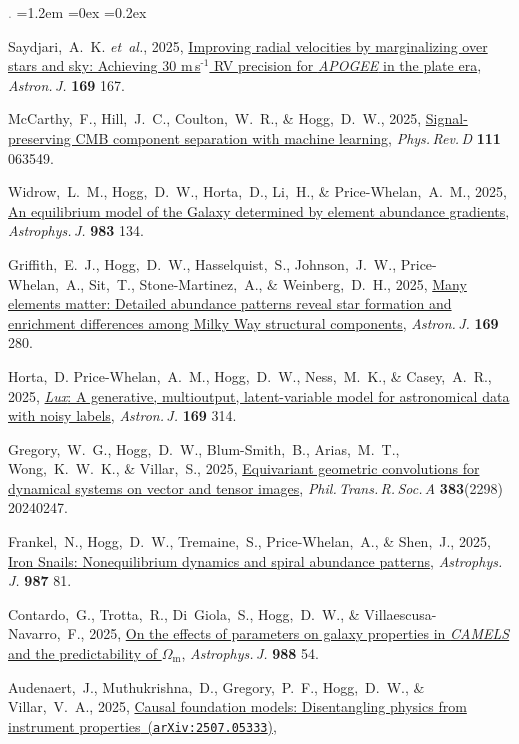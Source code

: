 \documentclass[10pt,letterpaper]{article}
\newcommand{\acronym}[1]{{\small{#1}}}
\newcommand{\foreign}[1]{\textsl{#1}}
\newcommand{\etal}{\foreign{et~al.}}
\newcommand{\project}[1]{\textsl{#1}}
\newcommand{\doi}[2]{\href{http://dx.doi.org/#1}{{#2}}}
\newcommand{\arxiv}[2]{\href{http://arxiv.org/abs/#1}{{#2}\ (\texttt{arXiv:#1})}}
\newcommand{\deemph}[1]{\textcolor{grey}{\footnotesize{#1}}}
\newcommand{\pubnumber}[1]{\deemph{{#1}.}}
\newcounter{refpubnum}
\newcommand{\hogglist}{%
    \rightmargin=0in
    \leftmargin=1.2em
    \topsep=0ex
    \partopsep=0pt
    \itemsep=0.2ex
    \parsep=0pt
    \itemindent=-1.0\leftmargin
    \listparindent=0.0\leftmargin
    \settowidth{\labelsep}{~}
    \usecounter{refpubnum}
  }
\begin{document}
\begin{list}{\pubnumber{\therefpubnum}}{\hogglist}
\item Saydjari,~A.~K. \etal, 2025,
  \doi{10.3847/1538-3881/adb02d}{Improving radial velocities by marginalizing over stars and sky: Achieving 30 m\,s$^{‑1}$ RV precision for \project{APOGEE} in the plate era},
  \textit{Astron.\,J.} \textbf{169} 167.
\item McCarthy,~F., Hill,~J.~C., Coulton,~W.~R., \& Hogg,~D.~W., 2025,
  \doi{10.1103/PhysRevD.111.063549}{Signal-preserving CMB component separation with machine learning},
  \textit{Phys.\,Rev.\,D} \textbf{111} 063549.
\item Widrow,~L.~M., Hogg,~D.~W., Horta,~D., Li,~H., \& Price-Whelan,~A.~M., 2025,
  \doi{10.3847/1538-4357/adbf12}{An equilibrium model of the Galaxy determined by element abundance gradients},
  \textit{Astrophys.\,J.} \textbf{983} 134.
\item Griffith,~E.~J., Hogg,~D.~W., Hasselquist,~S., Johnson,~J.~W., Price-Whelan,~A., Sit,~T., Stone-Martinez,~A., \& Weinberg,~D.~H., 2025,
  \doi{10.3847/1538-3881/adc07f}{Many elements matter: Detailed abundance patterns reveal star formation and enrichment differences among Milky Way structural components},
  \textit{Astron.\,J.} \textbf{169} 280.
\item Horta,~D. Price-Whelan,~A.~M., Hogg,~D.~W., Ness,~M.~K., \& Casey,~A.~R., 2025,
  \doi{10.3847/1538-3881/adcc20}{\project{Lux}: A generative, multioutput, latent-variable model for astronomical data with noisy labels},
  \textit{Astron.\,J.} \textbf{169} 314.
\item Gregory,~W.~G., Hogg,~D.~W., Blum-Smith,~B., Arias,~M.~T., Wong,~K.~W.~K., \& Villar,~S., 2025,
  \doi{10.1098/rsta.2024.0247}{Equivariant geometric convolutions for dynamical systems on vector and tensor images},
  \textit{Phil.\,Trans.\,R.\,Soc.\,A} \textbf{383}(2298) 20240247.
\item Frankel,~N., Hogg,~D.~W., Tremaine,~S., Price-Whelan,~A., \& Shen,~J., 2025,
  \doi{10.3847/1538-4357/add5ea}{Iron Snails: Nonequilibrium dynamics and spiral abundance patterns},
  \textit{Astrophys.\,J.} \textbf{987} 81.
\item Contardo,~G., Trotta,~R., Di~Giola,~S., Hogg,~D.~W., \& Villaescusa-Navarro,~F., 2025,
  \doi{10.3847/1538-4357/addd08}{On the effects of parameters on galaxy properties in \project{\acronym{CAMELS}} and the predictability of $\Omega_\mathrm{m}$},
  \textit{Astrophys.\,J.} \textbf{988} 54.
\item Audenaert,~J., Muthukrishna,~D., Gregory,~P.~F., Hogg,~D.~W., \& Villar,~V.~A., 2025,
  \arxiv{2507.05333}{Causal foundation models: Disentangling physics from instrument properties},

\end{list}
\end{document}
